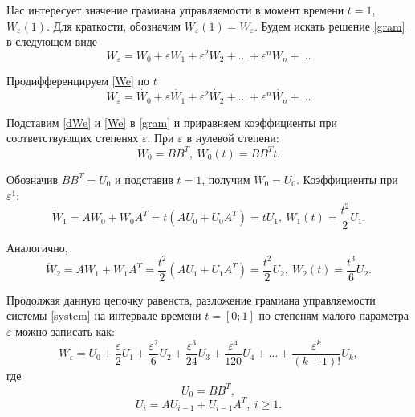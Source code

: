 \documentclass[../main.tex]{subfiles}
\begin{document}
 Нас интересует значение грамиана управляемости в момент времени $ t = 1$, $ W_{\varepsilon}(1) $. Для краткости, обозначим $ W_{\varepsilon}(1) = W_{\varepsilon} $.
 Будем искать решение \eqref{gram} в следующем виде
 \begin{equation}\label{We}
	 W_{\varepsilon} = W_0 + \varepsilon W_1 + \varepsilon^2 W_2 + \dots + \varepsilon^n W_n + \dots 
 \end{equation}
 
 Продифференцируем \eqref{We} по $ t $
 \begin{equation}\label{dWe}
	 \dot{W_{\varepsilon}} = \dot{W_0} + \varepsilon \dot{W_1} + \varepsilon^2 \dot{W_2} + \dots + \varepsilon^n \dot{W_n} + \dots 
 \end{equation}
 
 Подставим \eqref{dWe} и \eqref{We} в \eqref{gram} и приравняем коэффициенты при соответствующих степенях $ \varepsilon $. При $ \varepsilon $ в нулевой степени:
 \begin{equation*}
	 \dot{W}_0 = B B ^T,  \ W_0(t) = B B ^Tt.
 \end{equation*}
 
 Обозначив $ B B^T = U_0 $ и подставив $ t = 1$, получим $ W_0 = U_0$. Коэффициенты при $ \varepsilon ^ 1$:
 \begin{equation*}
	 \dot{W}_1 = A W_0 + W_0 A^T = t \left( A U_0 + U_0 A^T \right) = t U_1 ,  \ W_1(t) = \frac{t^2}{2}U_1.
 \end{equation*}
 
 Аналогично,
 \begin{equation*}
	 \dot{W}_2 = A W_1 + W_1 A^T = \dfrac{t^2}{2} \left( A U_1 + U_1 A^T \right) = \dfrac{t^2}{2} U_2 ,  \ W_2(t) = \dfrac{t^3}{6}U_2.
 \end{equation*}
 
 Продолжая данную цепочку равенств, разложение грамиана управляемости системы \eqref{system} на интервале времени $t = [0;1] $ по степеням малого параметра $ \varepsilon $ можно записать как:
 \begin{equation}\label{gram1}
	 W_{\varepsilon} = U_0 + \dfrac{\varepsilon}{2}U_1 + \dfrac{\varepsilon^2}{6} U_2 + \dfrac{\varepsilon^3}{24}U_3 + \dfrac{\varepsilon^4}{120}U_4 + \dots + \dfrac{\varepsilon^k}{(k+1)!}U_k,
 \end{equation}
 где
 \begin{equation*}
	 U_0 = B B^T,
 \end{equation*}
 \begin{equation*}
	 U_i  = A U_{i-1} + U_{i-1} A^T, \ i \geq 1.
 \end{equation*}
 
\end{document}
